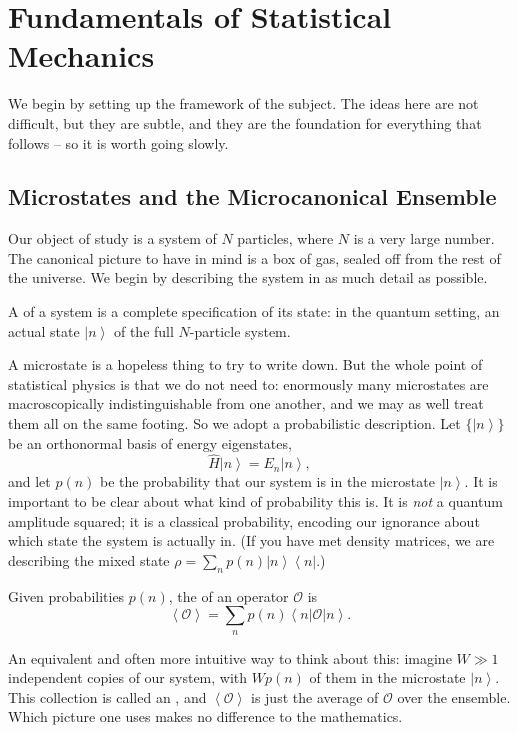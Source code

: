 \documentclass[a4paper]{scrartcl}
\newcommand{\ket}[1]{\left| #1 \right\rangle}
\newcommand{\bra}[1]{\left\langle #1 \right|}
\newcommand{\avg}[1]{\left\langle #1 \right\rangle}
\begin{document}
\tableofcontents

\section{Fundamentals of Statistical Mechanics}

We begin by setting up the framework of the subject. The ideas here are not difficult, but they are subtle, and they are the foundation for everything that follows -- so it is worth going slowly.

\subsection{Microstates and the Microcanonical Ensemble}

Our object of study is a system of $N$ particles, where $N$ is a very large number. The canonical picture to have in mind is a box of gas, sealed off from the rest of the universe. We begin by describing the system in as much detail as possible.

\begin{definition}[Microstate]
	A  of a system is a complete specification of its state: in the quantum setting, an actual state $\ket{n}$ of the full $N$-particle system.
\end{definition}

A microstate is a hopeless thing to try to write down. But the whole point of statistical physics is that we do not need to: enormously many microstates are macroscopically indistinguishable from one another, and we may as well treat them all on the same footing. So we adopt a probabilistic description. Let $\{\ket n\}$ be an orthonormal basis of energy eigenstates,
$$
\hat H \ket{n} = E_n \ket{n},
$$
and let $p(n)$ be the probability that our system is in the microstate $\ket n$. It is important to be clear about what kind of probability this is. It is \emph{not} a quantum amplitude squared; it is a classical probability, encoding our ignorance about which state the system is actually in. (If you have met density matrices, we are describing the mixed state $\rho = \sum_n p(n) \ket n \bra n$.)

\begin{definition}
	Given probabilities $p(n)$, the  of an operator $\mathcal O$ is
	$$
	\avg{\mathcal O} = \sum_n p(n) \bra n \mathcal O \ket n.
	$$
\end{definition}

An equivalent and often more intuitive way to think about this: imagine $W \gg 1$ independent copies of our system, with $W p(n)$ of them in the microstate $\ket n$. This collection is called an , and $\avg{\mathcal O}$ is just the average of $\mathcal O$ over the ensemble. Which picture one uses makes no difference to the mathematics.
\end{document}
